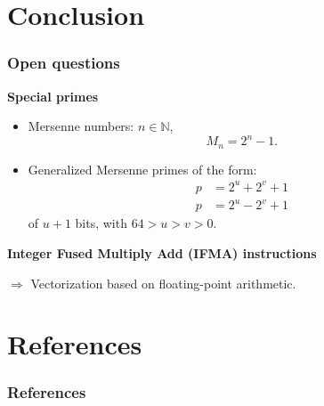 \documentclass[10pt]{beamer}
\begin{document}
\section{Conclusion}
\begin{frame}
    \frametitle{Open questions}

    \textbf{Special primes}
    \begin{itemize}
        \item Mersenne numbers: $n\in \mathbb{N}$,
            $$M_n = 2^n - 1.$$
        \item Generalized Mersenne primes of the form:
            \begin{align*}
                p &= 2^u + 2^v + 1 \\ 
                p &= 2^u - 2^v + 1 
            \end{align*}
            of $u+1$ bits, with $64 > u > v > 0$.
    \end{itemize}

    \bigskip
    \textbf{Integer Fused Multiply Add (IFMA) instructions}
    
    $\Longrightarrow$ Vectorization based on floating-point arithmetic.

\end{frame}

\section{References}
\begin{frame}
    \frametitle{References}

     
     
    \nocite{*}
\end{frame}
\end{document}
